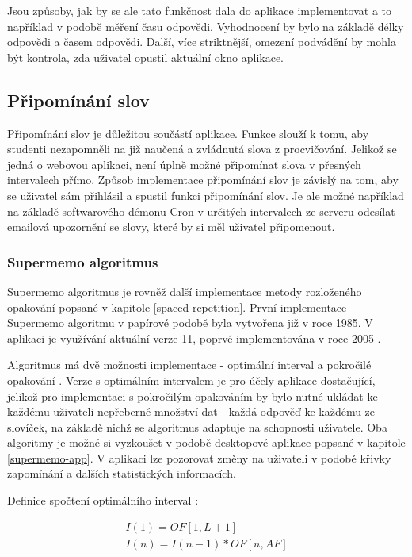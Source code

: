 \documentclass[a4paper,11pt,titlepage,fleqn]{article}
\begin{document}
            Jsou způsoby, jak by se ale tato funkčnost dala do aplikace implementovat a to například v podobě měření času odpovědi. Vyhodnocení by bylo na základě délky odpovědi a časem odpovědi. Další, více striktnější, omezení podvádění by mohla být kontrola, zda uživatel opustil aktuální okno aplikace.

    \subsection{Připomínání slov}
        Připomínání slov je důležitou součástí aplikace. Funkce slouží k tomu, aby studenti nezapomněli na již naučená a zvládnutá slova z procvičování. Jelikož se jedná o webovou aplikaci, není úplně možné připomínat slova v přesných intervalech přímo. Způsob implementace připomínání slov je závislý na tom, aby se uživatel sám přihlásil a spustil funkci připomínání slov. Je ale možné například na základě softwarového démonu Cron v určitých intervalech ze serveru odesílat emailová upozornění se slovy, které by si měl uživatel připomenout.

        \subsubsection{Supermemo algoritmus}
            \label{supermemo}
            Supermemo algoritmus je rovněž další implementace metody rozloženého opakování popsané v kapitole \ref{spaced-repetition}. První implementace Supermemo algoritmu v papírové podobě byla vytvořena již v roce 1985. V aplikaci je využívání aktuální verze 11, poprvé implementována v roce 2005 \cite{bib:supermemo}. 

            Algoritmus má dvě možnosti implementace - optimální interval a pokročilé opakování \cite{bib:supermemo}. Verze s optimálním intervalem je pro účely aplikace dostačující, jelikož pro implementaci s pokročilým opakováním by bylo nutné ukládat ke každému uživateli nepřeberné množství dat - každá odpověď ke každému ze slovíček, na základě nichž se algoritmus adaptuje na schopnosti uživatele. Oba algoritmy je možné si vyzkoušet v podobě desktopové aplikace popsané v kapitole \ref{supermemo-app}. V aplikaci lze pozorovat změny na uživateli v podobě křivky zapomínání a dalších statistických informacích. 

            Definice spočtení optimálního interval \cite{bib:supermemo}: 

                \begin{gather}
                    I(1)=OF[1,L+1]\label{eq:2}\\
                    I(n)=I(n-1)*OF[n,AF]
                \end{gather}
\end{document}
